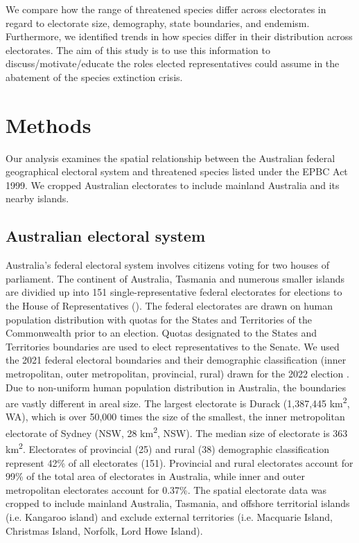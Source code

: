 \documentclass[a4paper,11pt]{article}
\begin{document}
We compare how the range of threatened species differ across electorates in regard to electorate size, demography, state boundaries, and endemism. Furthermore, we identified trends in how species differ in their distribution across electorates. The aim of this study is to use this information to discuss/motivate/educate the roles elected representatives could assume in the abatement of the species extinction crisis.

\section{Methods}

Our analysis examines the spatial relationship between the Australian federal geographical electoral system and threatened species listed under the EPBC Act 1999. We cropped Australian electorates to include mainland Australia and its nearby islands.

\subsection{Australian electoral system}

Australia's federal electoral system involves citizens voting for two houses of parliament. The continent of Australia, Tasmania and numerous smaller islands are dividied up into 151 single-representative federal electorates for elections to the House of Representatives (\cite{parliamentofaustraliaElectoralDivisions2018}). The federal electorates are drawn on human population distribution with quotas for the States and Territories of the Commonwealth prior to an election. Quotas designated to the States and Territories boundaries are used to elect representatives to the Senate. We used the 2021 federal electoral boundaries and their demographic classification (inner metropolitan, outer metropolitan, provincial, rural) drawn for the 2022 election \cite{australiaelectoralcomissionFederalElectoralBoundaries2019}. Due to non-uniform human population distribution in Australia, the boundaries are vastly different in areal size. The largest electorate is Durack (1,387,445 km\textsuperscript{2}, WA), which is over 50,000 times the size of the smallest, the inner metropolitan electorate of Sydney (NSW, 28 km\textsuperscript{2}, NSW). The median size of electorate is 363 km\textsuperscript{2}. Electorates of provincial (25) and rural (38) demographic classification represent 42\% of all electorates (151). Provincial and rural electorates account for 99\% of the total area of electorates in Australia, while inner and outer metropolitan electorates account for 0.37\%. The spatial electorate data was cropped to include mainland Australia, Tasmania, and offshore territorial islands (i.e. Kangaroo island) and exclude external territories (i.e. Macquarie Island, Christmas Island, Norfolk, Lord Howe Island).
\end{document}
